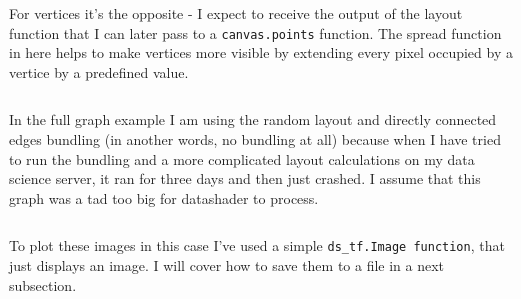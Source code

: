 \documentclass[12pt, a4paper]{article}
\begin{document}
For vertices it's the opposite - I expect to receive the output of the layout function that I can later pass to a \texttt{canvas.points} function.
The spread function in here helps to make vertices more visible by extending every pixel occupied by a vertice by a predefined value.

\bgroup
  \inputminted[linenos, breaklines=true, fontsize=\scriptsize]{python}{src/youtube/plot_functions.py}
  \label{listing:youtube_plot_functions}
\egroup

In the full graph example I am using the random layout and directly connected edges bundling (in another words, no bundling at all) because when I have tried to run the bundling and a more complicated layout calculations on my data science server, it ran for three days and then just crashed. I assume that this graph was a tad too big for datashader to process.

\bgroup
  \inputminted[linenos, breaklines=true, fontsize=\scriptsize, firstnumber=last]{python}{src/youtube/datashader/simple/1a_prep.py}
  \label{listing:youtube_lgr_1a}
\egroup

To plot these images in this case I've used a simple \texttt{ds\_tf.Image function}, that just displays an image. I will cover how to save them to a file in a next subsection.

\bgroup
  \inputminted[linenos, breaklines=true, fontsize=\scriptsize, firstnumber=last]{python}{src/youtube/datashader/simple/1b_plot.py}
  \label{listing:youtube_lgr_1b}
\egroup

\end{document}
